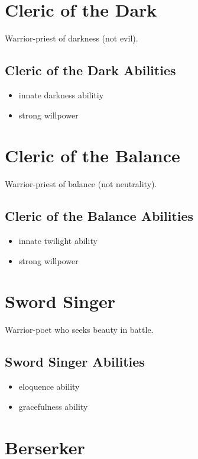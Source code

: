 \begin{multicols}{2}
\section{Cleric of the Dark}

Warrior-priest of darkness (not evil).

\subsection{Cleric of the Dark Abilities}

\begin{itemize}
    \item innate darkness abilitiy
    \item strong willpower
\end{itemize}

\section{Cleric of the Balance}

Warrior-priest of balance (not neutrality).

\subsection{Cleric of the Balance Abilities}

\begin{itemize}
    \item innate twilight ability
    \item strong willpower
\end{itemize}

\section{Sword Singer}

Warrior-poet who seeks beauty in battle.

\subsection{Sword Singer Abilities}

\begin{itemize}
    \item eloquence ability
    \item gracefulness ability
\end{itemize}

\section{Berserker}


\end{multicols}
